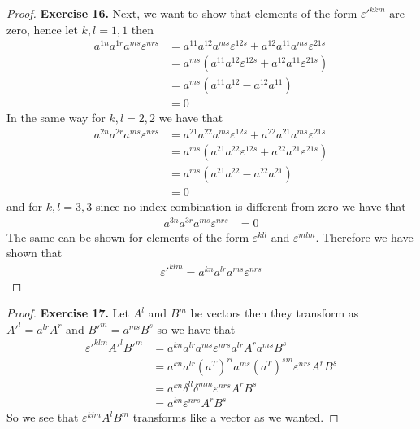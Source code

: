\documentclass[11pt]{article}
\theoremstyle{definition}
\begin{document}
\begin{proof}{\textbf{Exercise 16.}}
    Next, we want to show that elements of the form $\varepsilon'^{kkm}$ are
    zero, hence let $k,l =1,1$ then
    \begin{align*}
        a^{1n}a^{1r}a^{ms}\varepsilon^{nrs} &=
        a^{11}a^{12}a^{ms}\varepsilon^{12s}
        + a^{12}a^{11}a^{ms}\varepsilon^{21s}\\
        &= a^{ms}(a^{11}a^{12}\varepsilon^{12s}
        + a^{12}a^{11}\varepsilon^{21s})\\
        &= a^{ms}(a^{11}a^{12} - a^{12}a^{11})\\
        &= 0
    \end{align*}
    In the same way for $k,l =2,2$ we have that
    \begin{align*}
        a^{2n}a^{2r}a^{ms}\varepsilon^{nrs} &=
        a^{21}a^{22}a^{ms}\varepsilon^{12s}
        + a^{22}a^{21}a^{ms}\varepsilon^{21s}\\
        &= a^{ms}(a^{21}a^{22}\varepsilon^{12s}
        + a^{22}a^{21}\varepsilon^{21s})\\
        &= a^{ms}(a^{21}a^{22} - a^{22}a^{21})\\
        &= 0
    \end{align*}
    and for $k,l =3,3$ since no index combination is different from zero we
    have that
    \begin{align*}
        a^{3n}a^{3r}a^{ms}\varepsilon^{nrs} &= 0 
    \end{align*}
    The same can be shown for elements of the form $\varepsilon^{kll}$ and
    $\varepsilon^{mlm}$. Therefore we have shown that
    \begin{align*}
        \varepsilon'^{klm} = a^{kn}a^{lr}a^{ms} \varepsilon^{nrs}
    \end{align*}
\end{proof}
\begin{proof}{\textbf{Exercise 17.}}
    Let $A^l$ and $B^m$ be vectors then they transform as
    $A'^l = a^{lr} A^r$ and $B'^m = a^{ms}B^s$ so we have that
    \begin{align*}
        \varepsilon'^{klm}A'^lB'^m &= a^{kn}a^{lr}a^{ms}\varepsilon^{nrs}a^{lr} A^ra^{ms}B^s\\
            &= a^{kn}a^{lr}(a^T)^{rl}a^{ms}(a^T)^{sm}\varepsilon^{nrs} A^rB^s\\
            &= a^{kn}\delta^{ll} \delta^{mm}\varepsilon^{nrs} A^rB^s\\
            &= a^{kn}\varepsilon^{nrs} A^rB^s
    \end{align*}
    So we see that $\varepsilon^{klm} A^lB^m$ transforms like a vector as we
    wanted.
\end{proof}
\end{document}
